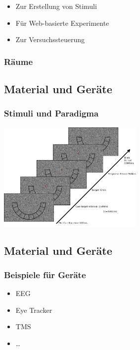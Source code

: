 \documentclass[
]{book}
\begin{document}
\begin{itemize}
\item
  Zur Erstellung von Stimuli
\item
  Für Web-basierte Experimente
\item
  Zur Versuchssteuerung
\end{itemize}

\hypertarget{ruxe4ume}{%
\subsubsection{Räume}\label{ruxe4ume}}

\hypertarget{material-und-geruxe4te}{%
\subsection{Material und Geräte}\label{material-und-geruxe4te}}

\hypertarget{stimuli-und-paradigma}{%
\subsubsection{Stimuli und Paradigma}\label{stimuli-und-paradigma}}

\begin{center}\includegraphics[width=200pt]{imgs/Ablauf} \end{center}

\hypertarget{material-und-geruxe4te-1}{%
\subsection{Material und Geräte}\label{material-und-geruxe4te-1}}

\hypertarget{beispiele-fuxfcr-geruxe4te}{%
\subsubsection{Beispiele für Geräte}\label{beispiele-fuxfcr-geruxe4te}}

\begin{itemize}
\item
  EEG
\item
  Eye Tracker
\item
  TMS
\item
  \ldots{}
\end{itemize}
\end{document}

